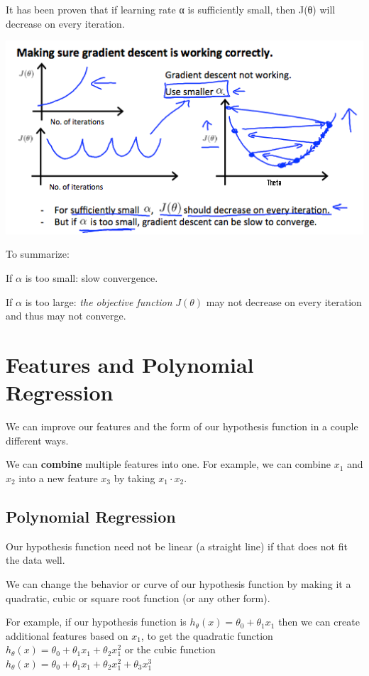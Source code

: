 \documentclass[
]{book}
\begin{document}
It has been proven that if learning rate α is sufficiently small, then J(θ) will decrease on every iteration.

\includegraphics{Gradient Descent in Practice II - Learning Rate graph2.png}

To summarize:

If \(\alpha\) is too small: slow convergence.

If \(\alpha\) is too large: \emph{the objective function} \(J(\theta)\) may not decrease on every iteration and thus may not converge.

\hypertarget{features-and-polynomial-regression}{%
\section{Features and Polynomial Regression}\label{features-and-polynomial-regression}}

We can improve our features and the form of our hypothesis function in a couple different ways.

We can \textbf{combine} multiple features into one. For example, we can combine \(x_1\) and \(x_2\) into a new feature \(x_3\) by taking \(x_1⋅x_2\).

\hypertarget{polynomial-regression}{%
\subsection{Polynomial Regression}\label{polynomial-regression}}

Our hypothesis function need not be linear (a straight line) if that does not fit the data well.

We can change the behavior or curve of our hypothesis function by making it a quadratic, cubic or square root function (or any other form).

For example, if our hypothesis function is \(h_\theta(x) = \theta_0 + \theta_1 x_1\) then we can create additional features based on \(x_1\), to get the quadratic function \(h_\theta(x) = \theta_0 + \theta_1 x_1 + \theta_2 x_1^2\) or the cubic function \(h_\theta(x) = \theta_0 + \theta_1 x_1 + \theta_2 x_1^2 + \theta_3 x_1^3\)
\end{document}
